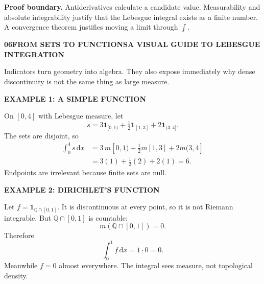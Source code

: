 \documentclass[10pt,a4paper]{article}
\newcommand{\1}{\mathbf 1}
\newcommand{\dd}{\,\mathrm d}
\newcommand{\footertext}{LEBESGUE INTEGRATION}
\newcommand{\pagehead}[3]{{\fontsize{7.2}{8}\selectfont\bfseries\color{teal}#1\quad #2\hfill\normalfont\color{muted}A VISUAL GUIDE TO LEBESGUE INTEGRATION}\par\vspace{2pt}{\color{line}\hrule height .45pt}\vspace{8pt}{\fontsize{22}{24}\selectfont\bfseries\color{navy}#3}\par\vspace{5pt}}
\newcommand{\lead}[1]{{\fontsize{11.2}{15}\selectfont #1\par}\vspace{5pt}}
\newcommand{\eyebrow}[1]{{\fontsize{7}{8}\selectfont\bfseries\color{teal}\MakeUppercase{#1}}}
\begin{document}
\begin{coralbox}\textbf{Proof boundary.} Antiderivatives calculate a candidate value. Measurability and absolute integrability justify that the Lebesgue integral exists as a finite number. A convergence theorem justifies moving a limit through $\int$.\end{coralbox}
\newpage

\renewcommand{\footertext}{WORKED EXAMPLES / INDICATORS / DIRICHLET FUNCTION}
\pagehead{06}{FROM SETS TO FUNCTIONS}{Two foundational examples}
\lead{Indicators turn geometry into algebra. They also expose immediately why dense discontinuity is not the same thing as large measure.}
\begin{minipage}[t]{.48\textwidth}
\begin{tealbox}\eyebrow{Example 1: a simple function}\par
On $[0,4]$ with Lebesgue measure, let
\[s=3\1_{[0,1)}+\tfrac12\1_{[1,3]}+2\1_{(3,4]}.\]
The sets are disjoint, so
\begin{align*}
\int_0^4s\dd x
&=3\,m[0,1)+\tfrac12m[1,3]+2m(3,4]\\
&=3(1)+\tfrac12(2)+2(1)=\boxed6.
\end{align*}
Endpoints are irrelevant because finite sets are null.\end{tealbox}
\end{minipage}\hfill
\begin{minipage}[t]{.48\textwidth}
\begin{goldbox}\eyebrow{Example 2: Dirichlet's function}\par
Let $f=\1_{\mathbb Q\cap[0,1]}$. It is discontinuous at every point, so it is not Riemann integrable. But $\mathbb Q\cap[0,1]$ is countable:
\[m(\mathbb Q\cap[0,1])=0.\]
Therefore
\[\int_0^1f\dd x=1\cdot0=\boxed0.\]
Meanwhile $f=0$ almost everywhere. The integral sees measure, not topological density.\end{goldbox}
\end{minipage}
\vspace{8pt}
\begin{center}
\end{center}
\newpage
\end{document}
